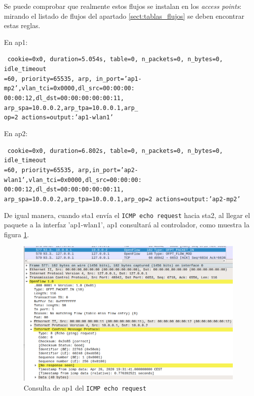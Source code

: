 \documentclass[a4paper,12pt,twoside,spanish]{book}
\begin{document}
Se puede comprobar que realmente estos flujos se instalan en los \textit{access points}: mirando el listado de flujos del apartado \ref{sect:tablas_flujos} se deben encontrar estas reglas.\par

En ap1:\par 

\noindent\texttt{
	cookie=0x0, duration=5.054s, table=0, n\_packets=0, n\_bytes=0, idle\_timeout\\
	=60, priority=65535, arp,
	in\_port='ap1-mp2',vlan\_tci=0x0000,dl\_src=00:00:00:\\
	00:00:12,dl\_dst=00:00:00:00:00:11,
	arp\_spa=10.0.0.2,arp\_tpa=10.0.0.1,arp\_\\
	op=2 actions=output:'ap1-wlan1'
}

\hspace{1cm}

En ap2:\par 

\noindent\texttt{
	cookie=0x0, duration=6.802s, table=0, n\_packets=0, n\_bytes=0, idle\_timeout\\
	=60, priority=65535,
	arp,in\_port='ap2-wlan1',vlan\_tci=0x0000,dl\_src=00:00:00:\\
	00:00:12,dl\_dst=00:00:00:00:00:11,
	arp\_spa=10.0.0.2,arp\_tpa=10.0.0.1,arp\_op=2 actions=output:'ap2-mp2'
}

De igual manera, cuando sta1 envía el \texttt{ICMP echo request} hacia sta2, al llegar el paquete a la interfaz 'ap1-wlan1', ap1 consultará al controlador, como muestra la figura \ref{fig:capt_6}.\par 
	
	\begin{figure}[!h]
		\centering
		\includegraphics[scale=0.4]{Figuras/capt_6.png}
		\caption{Consulta de ap1 del \texttt{ICMP echo request}}
		\label{fig:capt_6}
	\end{figure}
\end{document}
